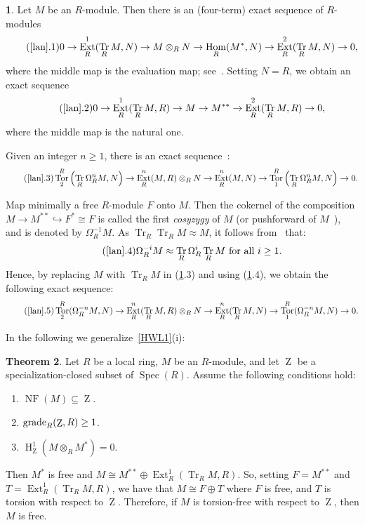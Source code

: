 \documentclass[11pt]{amsart}
\theoremstyle{definition}
\newtheorem{thm}{Theorem}[section]
\theoremstyle{definition}
\newtheorem{chunk}[thm]{\hspace*{-1.065ex}\bf}
\numberwithin{equation}{section}
\DeclareMathOperator{\gr}{\textnormal{grade}}
\DeclareMathOperator{\Tr}{Tr}
\DeclareMathOperator{\mz}{Z}
\DeclareMathOperator{\Ext}{Ext}
\DeclareMathOperator{\hh}{H}
\DeclareMathOperator{\Hom}{Hom}
\DeclareMathOperator{\Spec}{Spec}
\DeclareMathOperator{\Tor}{Tor}
\DeclareMathOperator{\NF}{NF}
\begin{document}
\begin{chunk} \label{lan} Let $M$ be an $R$-module. Then there is an (four-term) exact sequence of $R$-modules 
\begin{equation}\tag{\ref{lan}.1}
0\rightarrow\Ext^1_R(\Tr_R M,N)\rightarrow M\otimes_RN\rightarrow\Hom_R(M^*,N)\to\Ext^2_R(\Tr_R M,N)\to0,
\end{equation}
where the middle map is the evaluation map; see~\cite[2.6]{AuBr}. Setting $N=R$, we obtain an exact sequence
\begin{equation}\tag{\ref{lan}.2}
0\rightarrow\Ext^1_R(\Tr_R M,R)\rightarrow M \rightarrow M^{**}\to\Ext^2_R(\Tr_R M,R)\to0, 
\end{equation}
where the middle map is the natural one.

Given an integer $n\geq 1$, there is an exact sequence~\cite[2.8]{AuBr}:
\begin{equation}\tag{\ref{lan}.3}
\Tor_2^R\left(\Tr_R\Omega_R^nM,N\right)\rightarrow\Ext^n_R(M,R)\otimes_RN\rightarrow\Ext^n_R(M,N)\rightarrow\Tor_1^R\left(\Tr_R\Omega_R^nM,N\right)\rightarrow0.
\end{equation}

Map minimally a free $R$-module $F$ onto $M$. Then the cokernel of the composition $M \to M^{\ast\ast} \hookrightarrow F^{\ast} \cong F$ is called the first \emph{cosyzygy} of $M$ (or pushforward of $M$~\cite{HJW}), and is denoted by $\Omega_R^{-1} M$. As $\Tr_R \Tr_R M\approx M$, it follows from~\cite[4.1]{ST2} that: 
\begin{equation}\tag{\ref{lan}.4}
\Omega_R^{-i}M \approx \Tr_R\Omega_R^i\Tr_R M \text{ for all } i\geq 1. 
\end{equation}
Hence, by replacing $M$ with $\Tr_R M$ in (\ref{lan}.3) and using (\ref{lan}.4), we obtain the following exact sequence:
\begin{equation}\tag{\ref{lan}.5}
\Tor_2^R(\Omega_R^{-n}M,N) \rightarrow \Ext^n_R(\Tr_R M,R)\otimes_RN\rightarrow\Ext^n_R(\Tr_R M,N)\rightarrow\Tor_1^R(\Omega_R^{-n}M,N)\rightarrow0.
\end{equation}
\end{chunk}

In the following we generalize~\ref{HWL1}(i):

\begin{thm}\label{t7} Let $R$ be a local ring, $M$ be an $R$-module, and let $\mz$ be a specialization-closed subset of $\Spec(R)$. Assume the following conditions hold:
\begin{enumerate}[\rm(i)]
\item $\NF(M)\subseteq\mz$. 
\item $\gr_R(\mz,R)\geq1$.
\item $\hh^1_{\mz}(M\otimes_RM^*)=0$.  
\end{enumerate}
Then $M^{\ast}$ is free and $M\cong M^{\ast\ast}\oplus \Ext^1_R(\Tr_R M,R)$. So, setting $F=M^{\ast\ast}$ and $T= \Ext^1_R(\Tr_R M,R)$, we have that $M\cong F \oplus T$ where $F$ is free, and $T$ is torsion with respect to $\mz$. Therefore, if $M$ is torsion-free with respect to $\mz$, then $M$ is free.
\end{thm}
\end{document}
